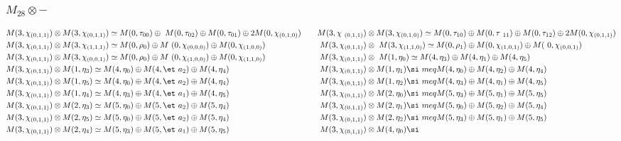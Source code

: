 \subsubsection{$M_28\otimes -$}
\begin{align*}
M(3,\chi_{(0,1,1)}) &\otimes M(3,\chi_{(0,1,1)}) \simeq M(0,\tau_{00}) \oplus \
M(0,\tau_{02}) \oplus M(0,\tau_{01}) \oplus 2 M(0,\chi_{(0,1,0)}) &&& M(3,\chi\
_{(0,1,1)}) &\otimes M(3,\chi_{(0,1,0)}) \simeq M(0,\tau_{10}) \oplus M(0,\tau\
_{11}) \oplus M(0,\tau_{12}) \oplus 2 M(0,\chi_{(0,1,1)})\\
M(3,\chi_{(0,1,1)}) &\otimes M(3,\chi_{(1,1,1)}) \simeq M(0,\rho_{0}) \oplus M\
(0,\chi_{(0,0,0)}) \oplus M(0,\chi_{(1,0,0)}) &&& M(3,\chi_{(0,1,1)}) &\otimes\
 M(3,\chi_{(1,1,0)}) \simeq M(0,\rho_{1}) \oplus M(0,\chi_{(1,0,1)}) \oplus M(\
0,\chi_{(0,0,1)})\\
M(3,\chi_{(0,1,1)}) &\otimes M(3,\chi_{(0,0,1)}) \simeq M(0,\rho_{0}) \oplus M\
(0,\chi_{(1,0,0)}) \oplus M(0,\chi_{(1,1,0)}) &&& M(3,\chi_{(0,1,1)}) &\otimes\
 M(1,\eta_{0}) \simeq M(4,\eta_{3}) \oplus M(4,\eta_{1}) \oplus M(4,\eta_{5})\
\\
M(3,\chi_{(0,1,1)}) &\otimes M(1,\eta_{3}) \simeq M(4,\eta_{0}) \oplus M(4,\et\
a_{2}) \oplus M(4,\eta_{4}) &&& M(3,\chi_{(0,1,1)}) &\otimes M(1,\eta_{1}) \si\
meq M(4,\eta_{0}) \oplus M(4,\eta_{2}) \oplus M(4,\eta_{4})\\
M(3,\chi_{(0,1,1)}) &\otimes M(1,\eta_{5}) \simeq M(4,\eta_{0}) \oplus M(4,\et\
a_{2}) \oplus M(4,\eta_{4}) &&& M(3,\chi_{(0,1,1)}) &\otimes M(1,\eta_{2}) \si\
meq M(4,\eta_{3}) \oplus M(4,\eta_{1}) \oplus M(4,\eta_{5})\\
M(3,\chi_{(0,1,1)}) &\otimes M(1,\eta_{4}) \simeq M(4,\eta_{3}) \oplus M(4,\et\
a_{1}) \oplus M(4,\eta_{5}) &&& M(3,\chi_{(0,1,1)}) &\otimes M(2,\eta_{0}) \si\
meq M(5,\eta_{3}) \oplus M(5,\eta_{1}) \oplus M(5,\eta_{5})\\
M(3,\chi_{(0,1,1)}) &\otimes M(2,\eta_{3}) \simeq M(5,\eta_{0}) \oplus M(5,\et\
a_{2}) \oplus M(5,\eta_{4}) &&& M(3,\chi_{(0,1,1)}) &\otimes M(2,\eta_{1}) \si\
meq M(5,\eta_{0}) \oplus M(5,\eta_{2}) \oplus M(5,\eta_{4})\\
M(3,\chi_{(0,1,1)}) &\otimes M(2,\eta_{5}) \simeq M(5,\eta_{0}) \oplus M(5,\et\
a_{2}) \oplus M(5,\eta_{4}) &&& M(3,\chi_{(0,1,1)}) &\otimes M(2,\eta_{2}) \si\
meq M(5,\eta_{3}) \oplus M(5,\eta_{1}) \oplus M(5,\eta_{5})\\
M(3,\chi_{(0,1,1)}) &\otimes M(2,\eta_{4}) \simeq M(5,\eta_{3}) \oplus M(5,\et\
a_{1}) \oplus M(5,\eta_{5}) &&& M(3,\chi_{(0,1,1)}) &\otimes M(4,\eta_{0}) \si\

\end{align*}
